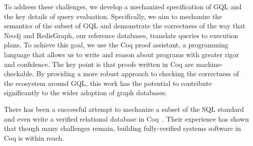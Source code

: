 \documentclass[14pt]{constructor-thesis}
\theoremstyle{definition}
\begin{document}

To address these challenges, we develop a mechanized specification of GQL and the key details of query evaluation. Specifically, we aim to mechanize the semantics of the subset of GQL and demonstrate the correctness of the way that Neo4j and RedisGraph, our reference databases, translate queries to execution plans. To achieve this goal, we use the Coq proof assistant, a programming language that allows us to write and reason about programs with greater rigor and confidence. The key point is that proofs written in Coq are machine-checkable. By providing a more robust approach to checking the correctness of the ecosystem around GQL, this work has the potential to contribute significantly to the wider adoption of graph databases.

There has been a successful attempt to mechanize a subset of the SQL standard~\cite{sql-in-coq} and even write a verified relational database in Coq~\cite{rdbms-in-coq}. Their experience has shown that though many challenges remain, building fully-verified systems software in Coq is within reach.



\end{document}
